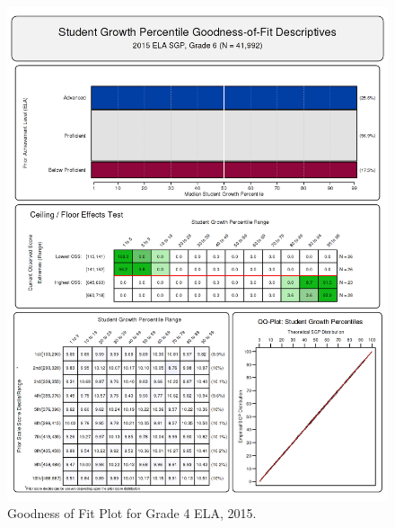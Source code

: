 \documentclass[12pt]{article}
\begin{document}
\begin{figure}[htbp]
\centering
\includegraphics{../img/Goodness_of_Fit/ELA.2015/2015_ELA_6;2014_ELA_5;2013_ELA_4;2012_ELA_3.png}
\caption{Goodness of Fit Plot for Grade 4 ELA, 2015.}
\end{figure}
\end{document}
